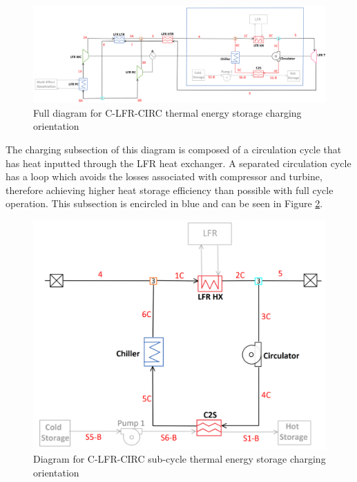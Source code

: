 \begin{figure}[H]
    \widefigure
    \includegraphics[width=\linewidth]{Definitions/c-lfr-circ.pdf}
    \caption{Full diagram for C-LFR-CIRC thermal energy storage charging orientation\label{c-lfr-circ}}
\end{figure}
\begin{paracol}{2}
\linenumbers
\switchcolumn

The charging subsection of this diagram is composed of a circulation cycle that has heat inputted through the LFR heat exchanger. A separated circulation cycle has a loop which avoids the losses associated with compressor and turbine, therefore achieving higher heat storage efficiency than possible with full cycle operation. This subsection is encircled in blue and can be seen in Figure \ref{c-lfr-circ-sub}.


\end{paracol}
\begin{figure}[H]
    \widefigure
    \includegraphics[width=8 cm]{Definitions/c-lfr-circ-sub.pdf}
    \caption{Diagram for C-LFR-CIRC sub-cycle thermal energy storage charging orientation\label{c-lfr-circ-sub}}
\end{figure}
